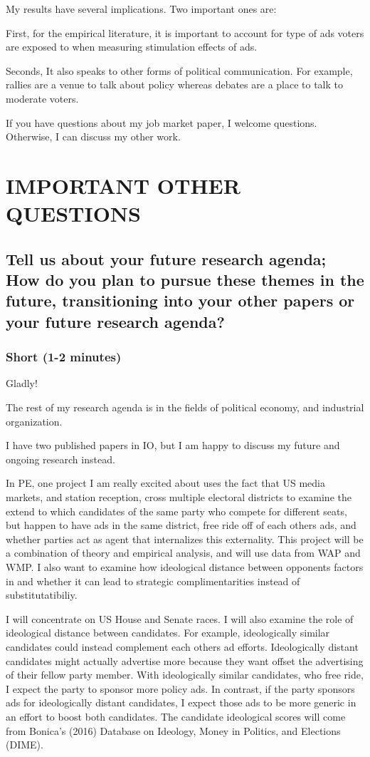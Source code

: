 \documentclass[12pt]{article}
\theoremstyle{plain}
\theoremstyle{plain}
\theoremstyle{plain}
\theoremstyle{plain}
\theoremstyle{plain}
\theoremstyle{plain}
\begin{document}
My results have several implications. Two important ones are:

First, for the empirical literature, it is important to account for type of ads voters are exposed to when measuring stimulation effects of ads.

Seconds, It also speaks to other forms of political communication.
For example, rallies are a venue to talk about policy whereas debates are a place to talk to moderate voters.


If you have questions about my job market paper, I welcome questions.
Otherwise, I can discuss my other work.

\clearpage


\section{IMPORTANT OTHER QUESTIONS}
\label{sec:org1a81a63}
\subsection{Tell us about your future research agenda; How do you plan to pursue these themes in the future, transitioning into your other papers or your future research agenda?}
\label{sec:org6574b8d}

\subsubsection{Short (1-2 minutes)}
\label{sec:orgd04c477}
Gladly!

The rest of my research agenda is in the fields of political economy, and industrial organization.

I have two published papers in IO, but I am happy to discuss my future and ongoing research instead.

In PE, one project I am really excited about
uses the fact that US media markets, and station reception, cross multiple electoral districts
to examine the extend to which candidates of the same party who compete for different seats,
but happen to have ads in the same district, free ride off of each others ads, and
whether parties act as agent that internalizes this externality.
This project will be a combination of theory and empirical analysis, and will use data from WAP and WMP.
I also want to examine how ideological distance between opponents factors in and whether it can lead to strategic
complimentarities instead of substitutatibiliy.

I will concentrate on US House and Senate races.
I will also examine the role of ideological distance between candidates.
For example, ideologically similar candidates could instead complement each others ad efforts.
Ideologically distant candidates might actually advertise more because they want offset the advertising of their fellow party member.
With ideologically similar candidates, who free ride, I expect the party to sponsor more policy ads.
In contrast, if the party sponsors ads for ideologically distant candidates, I expect those ads to be more generic in an effort to boost both candidates.
The candidate ideological scores will come from Bonica's (2016) Database on Ideology, Money in Politics, and Elections (DIME).
\end{document}
